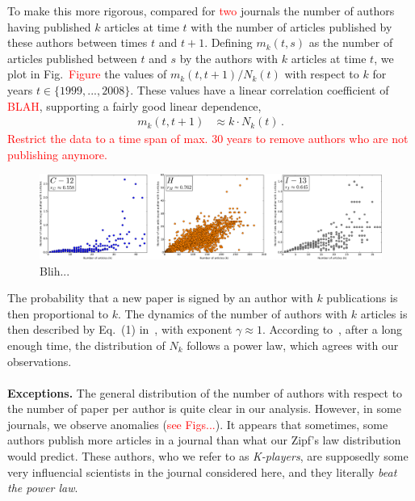 \documentclass[aps,prl,floatfix,twocolumn]{revtex4-1}
\begin{document}
To make this more rigorous, compared for \textcolor{red}{two} journals the number of authors having published $k$ articles at time $t$ 
with the number of articles published by these authors between times $t$ and $t+1$. 
Defining $m_k(t,s)$ as the number of articles published between $t$ and $s$ by the authors with $k$ articles at time $t$, we plot in Fig.~\textcolor{red}{Figure} the values of 
$m_k(t,t+1)/N_k(t)$ with respect to $k$ for years $t\in\{1999,...,2008\}$. 
These values have a linear correlation coefficient of \textcolor{red}{BLAH}, supporting a fairly good linear dependence, 
\begin{align}
 m_k(t,t+1) &\approx k\cdot N_k(t)\, . 
\end{align}
\textcolor{red}{Restrict the data to a time span of max. 30 years to remove authors who are not publishing anymore.}

\begin{figure}
 \centering
 \includegraphics[width=\textwidth]{figures/CHI_correl.pdf}
 \caption{Blih...}
 \label{fig:2}
\end{figure}


The probability that a new paper is signed by an author with $k$ publications is then proportional to $k$. 
The dynamics of the number of authors with $k$ articles is then described by Eq.~(1) in~\cite{Kra00}, with exponent $\gamma\approx 1$. 
According to~\cite{Kra00}, after a long enough time, the distribution of $N_k$ follows a power law, which agrees with our observations.

\paragraph{}
{\bf Exceptions. }
The general distribution of the number of authors with respect to the number of paper per author is quite clear in our analysis. 
However, in some journals, we observe anomalies (\textcolor{red}{see Figs...}). 
It appears that sometimes, some authors publish more articles in a journal than what our Zipf's law distribution would predict. 
These authors, who we refer to as \emph{K-players}, are supposedly some very influencial scientists in the journal considered here, and they literally \emph{beat the power law}.
\end{document}
